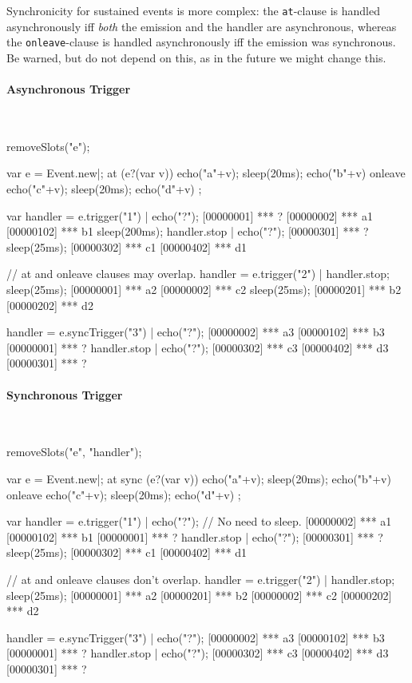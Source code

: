 Synchronicity for sustained events is more complex: the
\lstinline|at|-clause is handled asynchronously iff \emph{both} the emission
and the handler are asynchronous, whereas the \lstinline|onleave|-clause is
handled asynchronously iff the emission was synchronous.  Be warned, but do
not depend on this, as in the future we might change this.

\begin{multicols}{2}
\paragraph{Asynchronous Trigger}~

\begin{urbicomment}
removeSlots("e");
\end{urbicomment}
\begin{urbiscript}[xrightmargin=0mm,xleftmargin=0mm]
var e = Event.new|;
at (e?(var v))
  { echo("a"+v); sleep(20ms); echo("b"+v) }
onleave
  { echo("c"+v); sleep(20ms); echo("d"+v) };

var handler = e.trigger("1") | echo("?");
[00000001] *** ?
[00000002] *** a1
[00000102] *** b1
sleep(200ms);
handler.stop | echo("?");
[00000301] *** ?
sleep(25ms);
[00000302] *** c1
[00000402] *** d1

// at and onleave clauses may overlap.
handler = e.trigger("2") | handler.stop;
sleep(25ms);
[00000001] *** a2
[00000002] *** c2
sleep(25ms);
[00000201] *** b2
[00000202] *** d2

handler = e.syncTrigger("3") | echo("?");
[00000002] *** a3
[00000102] *** b3
[00000001] *** ?
handler.stop | echo("?");
[00000302] *** c3
[00000402] *** d3
[00000301] *** ?
\end{urbiscript}
\columnbreak

\paragraph{Synchronous Trigger}~

\begin{urbicomment}
removeSlots("e", "handler");
\end{urbicomment}
\begin{urbiscript}[xrightmargin=0mm,xleftmargin=0mm]
var e = Event.new|;
at sync (e?(var v))
  { echo("a"+v); sleep(20ms); echo("b"+v) }
onleave
  { echo("c"+v); sleep(20ms); echo("d"+v) };

var handler = e.trigger("1") | echo("?");
// No need to sleep.
[00000002] *** a1
[00000102] *** b1
[00000001] *** ?
handler.stop | echo("?");
[00000301] *** ?
sleep(25ms);
[00000302] *** c1
[00000402] *** d1

// at and onleave clauses don't overlap.
handler = e.trigger("2") | handler.stop;
sleep(25ms);
[00000001] *** a2
[00000201] *** b2
[00000002] *** c2
[00000202] *** d2

handler = e.syncTrigger("3") | echo("?");
[00000002] *** a3
[00000102] *** b3
[00000001] *** ?
handler.stop | echo("?");
[00000302] *** c3
[00000402] *** d3
[00000301] *** ?
\end{urbiscript}
\end{multicols}


